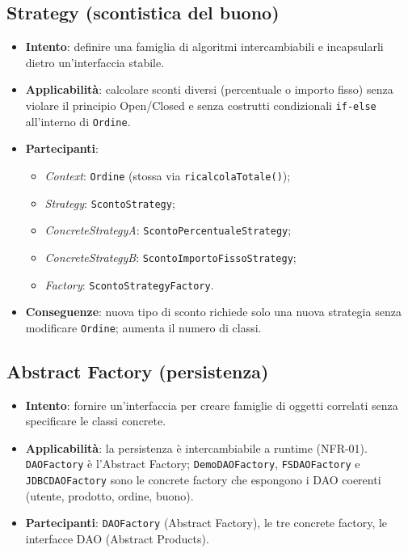 \subsection{Strategy (scontistica del buono)}
\begin{itemize}
    \item \textbf{Intento}: definire una famiglia di algoritmi intercambiabili e incapsularli dietro un'interfaccia stabile.
    \item \textbf{Applicabilità}: calcolare sconti diversi (percentuale o importo fisso) senza violare il principio Open/Closed e senza costrutti condizionali \texttt{if-else} all'interno di \texttt{Ordine}.
    \item \textbf{Partecipanti}:
        \begin{itemize}
            \item \emph{Context}: \texttt{Ordine} (stossa via \texttt{ricalcolaTotale()});
            \item \emph{Strategy}: \texttt{ScontoStrategy};
            \item \emph{ConcreteStrategyA}: \texttt{ScontoPercentualeStrategy};
            \item \emph{ConcreteStrategyB}: \texttt{ScontoImportoFissoStrategy};
            \item \emph{Factory}: \texttt{ScontoStrategyFactory}.
        \end{itemize}
    \item \textbf{Conseguenze}: nuova tipo di sconto richiede solo una nuova strategia senza modificare \texttt{Ordine}; aumenta il numero di classi.
\end{itemize}

\subsection{Abstract Factory (persistenza)}
\begin{itemize}
    \item \textbf{Intento}: fornire un'interfaccia per creare famiglie di oggetti correlati senza specificare le classi concrete.
    \item \textbf{Applicabilità}: la persistenza è intercambiabile a runtime (NFR-01). \texttt{DAOFactory} è l'Abstract Factory; \texttt{DemoDAOFactory}, \texttt{FSDAOFactory} e \texttt{JDBCDAOFactory} sono le concrete factory che espongono i DAO coerenti (utente, prodotto, ordine, buono).
    \item \textbf{Partecipanti}: \texttt{DAOFactory} (Abstract Factory), le tre concrete factory, le interfacce DAO (Abstract Products).
\end{itemize}

